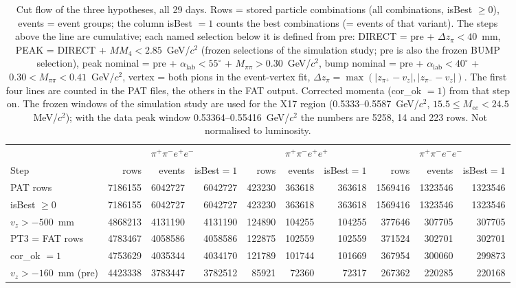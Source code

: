 \begin{table}[H]
\centering\scriptsize
\setlength{\tabcolsep}{3pt}
\caption{Cut flow of the three hypotheses, all 29 days. Rows = stored particle combinations (all combinations, isBest $\geq 0$), events = event groups; the column isBest $=1$ counts the best combinations (= events of that variant). The steps above the line are cumulative; each named selection below it is defined from pre: DIRECT = pre + $\Delta z_\pi<40$~mm, PEAK = DIRECT + $MM_4<2.85$~GeV/$c^2$ (frozen selections of the simulation study; pre is also the frozen BUMP selection), peak nominal = pre + $\alpha_\mathrm{lab}<55^\circ$ + $M_{\pi\pi}>0.30$~GeV/$c^2$, bump nominal = pre + $\alpha_\mathrm{lab}<40^\circ$ + $0.30<M_{\pi\pi}<0.41$~GeV/$c^2$, vertex = both pions in the event-vertex fit, $\Delta z_\pi=\max(|z_{\pi^+}-v_z|,|z_{\pi^-}-v_z|)$. The first four lines are counted in the PAT files, the others in the FAT output. Corrected momenta (cor\_ok $=1$) from that step on. The frozen windows of the simulation study are used for the X17 region (0.5333--0.5587~GeV/$c^2$, $15.5\leq M_{ee}<24.5$~MeV/$c^2$); with the data peak window 0.53364--0.55416~GeV/$c^2$ the numbers are 5258, 14 and 223 rows. Not normalised to luminosity.}
\label{tab:smp_cutflow}
\begin{tabular}{l rrr rrr rrr}
\toprule
 & \multicolumn{3}{c}{$\pi^+\pi^-e^+e^-$} & \multicolumn{3}{c}{$\pi^+\pi^-e^+e^+$} & \multicolumn{3}{c}{$\pi^+\pi^-e^-e^-$} \\
\cmidrule(lr){2-4}\cmidrule(lr){5-7}\cmidrule(lr){8-10}
Step & rows & events & isBest$=1$ & rows & events & isBest$=1$ & rows & events & isBest$=1$ \\
\midrule
PAT rows & 7186155 & 6042727 & 6042727 & 423230 & 363618 & 363618 & 1569416 & 1323546 & 1323546 \\
isBest $\geq 0$ & 7186155 & 6042727 & 6042727 & 423230 & 363618 & 363618 & 1569416 & 1323546 & 1323546 \\
$v_z>-500$~mm & 4868213 & 4131190 & 4131190 & 124890 & 104255 & 104255 & 377646 & 307705 & 307705 \\
PT3 = FAT rows & 4783467 & 4058586 & 4058586 & 122875 & 102559 & 102559 & 371524 & 302701 & 302701 \\
cor\_ok $=1$ & 4753629 & 4035344 & 4034170 & 121789 & 101744 & 101669 & 367954 & 300060 & 299873 \\
$v_z>-160$~mm (pre) & 4423338 & 3783447 & 3782512 & 85921 & 72360 & 72317 & 267362 & 220285 & 220168 \\

\end{tabular}
\end{table}
